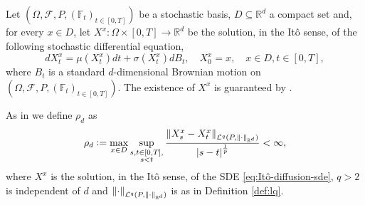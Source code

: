 \documentclass{article}
\numberwithin{equation}{section}
\newcommand{\1}{\mathbbm{1}}
\newcommand{\s}{s} %
\begin{document}
Let $(\Omega, \mathcal{F}, P, (\mathbb{F}_t)_{t\in[0,T]})$ be a stochastic basis, $D\subseteq \mathbb{R}^d$ a compact set and, for every $x\in D$, let $X^x : \Omega\times[0,T]\to\mathbb{R}^d$ be the solution, in the Itô sense, of the following stochastic differential equation, 
\begin{equation}\label{eq:Itô-diffusion-sde}
    dX^x_t = \mu(X^x_t)dt + \sigma(X^x_t)dB_t, \quad X^x_0=x, \quad x\in D, t\in[0,T],
\end{equation}
where $B_t$ is a standard $d$-dimensional Brownian motion on $(\Omega, \mathcal{F}, P, (\mathbb{F}_t)_{t\in[0,T]})$. The existence of $X^x$ is guaranteed by \cite[Theorem 4.5.1]{nasode}.

As in \cite[Theorem 3.3]{deryck2021pinn} we define $\rho_d$ as
\begin{equation}\label{eq:rhod}
    \rho_d :=  \max_{x\in D}\sup_{\substack{s,t \in [0,T],\\s<t}} \frac{\norm{X^x_s-X^x_t}_{\mathcal{L}^q(P, \norm{\cdot}_{\mathbb{R}^d})}}{\abs{s-t}^{\frac{1}{p}}} <\infty,  
\end{equation}
where $X^x$ is the solution, in the Itô sense, of the SDE \eqref{eq:Itô-diffusion-sde}, $q>2$ is independent of $d$ and $\norm{\cdot}_{\mathcal{L}^q(P, \norm{\cdot}_{\mathbb{R}^d})}$ is as in Definition \ref{def:lq}.
\end{document}
